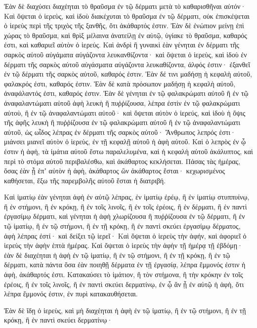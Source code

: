 {Ἐὰν δὲ διαχύσει διαχέηται τὸ θραῦσμα ἐν τῷ δέρματι μετὰ τὸ καθαρισθῆναι αὐτόν·
Καὶ ὄψεται ὁ ἱερεὺς, καὶ ἰδοὺ διακέχυται τὸ θραῦσμα ἐν τῷ δέρματι, οὐκ ἐπισκέψεται ὁ ἱερεὺς περὶ τῆς τριχὸς τῆς ξανθῆς, ὅτι ἀκάθαρτός ἐστιν.
Ἐὰν δὲ ἐνώπιον μείνῃ ἐπὶ χώρας τὸ θραῦσμα, καὶ θρὶξ μέλαινα ἀνατείλῃ ἐν αὐτῷ, ὑγίακε τὸ θραῦσμα, καθαρός ἐστι, καὶ καθαριεῖ αὐτὸν ὁ ἱερεύς.
Καὶ ἀνδρὶ ἢ γυναικὶ ἐὰν γένηται ἐν δέρματι τῆς σαρκὸς αὐτοῦ αὐγάματα αὐγάζοντα λευκανθίζοντα·
καὶ ὄψεται ὁ ἱερεὺς, καὶ ἰδοὺ ἐν δέρματι τῆς σαρκὸς αὐτοῦ αὐγάσματα αὐγάζοντα λευκαθίζοντα, ἀλφός ἐστιν· ἐξανθεῖ ἐν τῷ δέρματι τῆς σαρκὸς αὐτοῦ, καθαρός ἐστιν.
Ἐὰν δέ τινι μαδήσῃ ἡ κεφαλὴ αὐτοῦ, φαλακρός ἐστι, καθαρός ἐστιν.
Ἐὰν δὲ κατὰ πρόσωπον μαδήσῃ ἡ κεφαλὴ αὐτοῦ, ἀναφάλαντός ἐστι, καθαρός ἐστιν.
Ἐὰν δὲ γένηται ἐν τῷ φαλακρώματι αὐτοῦ ἢ ἐν τῷ ἀναφαλαντώματι αὐτοῦ ἁφὴ λευκὴ ἢ πυῤῥίζουσα, λέπρα ἐστὶν ἐν τῷ φαλακρώματι αὐτοὺ, ἢ ἐν τῷ ἀναφαλαντώματι αὐτοῦ·
καὶ ὄψεται αὐτὸν ὁ ἱερεύς, καὶ ἰδοὺ ἡ ὄψις τῆς ἁφῆς λευκὴ ἢ πυῤῥίζουσα ἐν τῷ φαλακρώματι αὐτοῦ ἢ ἐν τῷ ἀναφαλαντώματι αὐτοῦ, ὡς ωἶδος λέπρας ἐν δέρματι τῆς σαρκὸς αὐτοῦ·
Ἄνθρωπος λεπρός ἐστι· μιάνσει μιανεῖ αὐτὸν ὁ ἱερεὺς, ἐν τῇ κεφαλῇ αὐτοῦ ἡ ἁφὴ αὐτοῦ.
Καὶ ὁ λεπρὸς ἐν ᾧ ἐστιν ἡ ἁφὴ, τὰ ἱμάτια αὐτοῦ ἔστω παραλελυμένα, καὶ ἡ κεφαλὴ αὐτοῦ ἀκάλυπτος, καὶ περὶ τὸ στόμα αὐτοῦ περιβαλέσθω, καὶ ἀκάθαρτος κεκλήσεται.
Πάσας τὰς ἡμέρας, ὅσας ἐὰν ᾖ ἐπʼ αὐτὸν ἡ ἁφὴ, ἀκάθαρτος ὢν ἀκάθαρτος ἔσται· κεχωρισμένος καθήσεται, ἔξω τῆς παρεμβολῆς αὐτοῦ ἔσται ἡ διατριβή.
\par }{\PP {}Καὶ ἱματίῳ ἐὰν γένηται ἁφὴ ἐν αὐτῷ λέπρας, ἐν ἱματίῳ ἐρέῳ, ἢ ἐν ἱματίῳ στυππυίνῳ,
ἢ ἐν στήμονι, ἢ ἐν κρόκῃ, ἢ ἐν τοῖς λινοῖς, ἢ ἐν τοῖς ἐρέοις, ἢ ἐν δέρματι, ἢ ἐν παντὶ ἐργασίμῳ δέρματι,
καὶ γένηται ἡ ἁφὴ χλωρίζουσα ἢ πυῤῥίζουσα ἐν τῷ δέρματι, ἢ ἐν τῷ ἱματίῳ, ἢ ἐν τῷ στήμονι, ἢ ἐν τῇ κρόκῃ, ἢ ἐν παντὶ σκεύει ἐργασίμῳ δέρματος, ἁφὴ λέπρας ἐστί· καὶ δείξει τῷ ἱερεῖ·
Καὶ ὄψεται ὁ ἱερεὺς τὴν ἁφήν, καὶ ἀφοριεῖ ὁ ἱερεὺς τὴν ἁφὴν ἑπτὰ ἡμέρας.
Καὶ ὄψεται ὁ ἱερεὺς τὴν ἁφὴν τῇ ἡμέρᾳ τῇ ἑβδόμῃ· ἐὰν δὲ διαχέηται ἡ ἁφὴ ἐν τῷ ἱματίῳ, ἢ ἐν τῷ στήμονι, ἢ ἐν τῇ κρόκῃ, ἢ ἐν τῷ δέρματι, κατὰ πάντα ὅσα ἐὰν ποιηθῇ δέρματα ἐν τῇ ἐργασίᾳ, λέπρα ἔμμονός ἐστιν ἡ ἁφὴ, ἀκάθαρτός ἐστι.
Κατακαύσει τὸ ἱμάτιον, ἢ τὸν στήμονα, ἢ τὴν κρόκην ἐν τοῖς ἐρέοις, ἢ ἐν τοῖς λινοῖς, ἢ ἐν παντὶ σκεύει δερματίνῳ, ἐν ᾧ ἂν ᾖ ἐν αὐτῷ ἡ ἁφὴ, ὅτι λέπρα ἔμμονός ἐστιν, ἐν πυρὶ κατακαυθήσεται.
\par }{\PP {}Ἐὰν δὲ ἴδῃ ὁ ἱερεὺς, καὶ μὴ διαχέηται ἡ ἁφὴ ἐν τῷ ἱματίῳ, ἢ ἐν τῷ στήμονι, ἢ ἐν τῇ κρόκῃ, ἢ ἐν παντὶ σκεύει δερματίνῳ·
}
